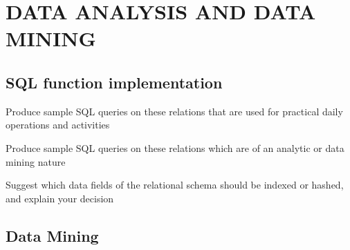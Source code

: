 \section{DATA ANALYSIS AND DATA MINING}
\label{section:analysis}
\subsection{SQL function implementation}
\label{sect:sub-title}
Produce sample SQL queries on these relations that are used for practical daily
operations and activities 

Produce sample SQL queries on these relations which are of an analytic or data 
mining nature

Suggest which data fields of the relational schema should be indexed or 
hashed, and explain your decision

\subsection{Data Mining}
\label{sect:sub-title}
